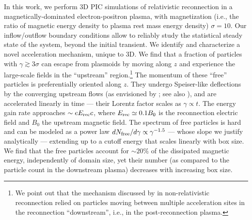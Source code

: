 \documentclass[twocolumn,twocolappendix]{aastex63}
\begin{document}

In this work, we perform 3D PIC simulations of relativistic reconnection in a magnetically-dominated electron-positron plasma, with magnetization (i.e., the ratio of magnetic energy density to plasma rest mass energy density) $\sigma=10$. Our inflow/outflow boundary conditions allow to reliably study the statistical steady state of the system, beyond the initial transient. We identify and characterize a novel acceleration mechanism, unique to 3D. 
We find that a fraction of particles with $\gamma\gtrsim 3\sigma$ can escape from plasmoids by moving along $z$ and experience the large-scale fields in the ``upstream'' region.\footnote{We point out that the mechanism discussed by \citet{li_2019} in non-relativistic reconnection relied on particles moving between multiple acceleration sites in the reconnection ``downstream'', i.e., in the post-reconnection plasma.} 
The momentum of these ``free'' particles is preferentially oriented along $z$. They undergo Speiser-like deflections by the converging upstream flows (as envisioned by \citet{giannios_10}; see also \citet{degouveia_05}), and are accelerated linearly in time --- their Lorentz factor scales as $\gamma\propto t$. The energy gain rate approaches $\sim eE_{\rm rec}c$, where $E_{\rm rec}\simeq 0.1 B_0$ is the reconnection electric field and $B_0$ the upstream magnetic field. The spectrum of free particles is hard and can be modeled as a power law $dN_{\rm free}/d\gamma\propto \gamma^{-1.5}$ --- whose slope we justify analytically ---
extending up to a cutoff energy that scales linearly with box size. We find that the free particles account for $\sim 20\%$ of the dissipated magnetic energy, independently of domain size, yet their number (as compared to the particle count in the downstream plasma) decreases with increasing box size.
\end{document}
